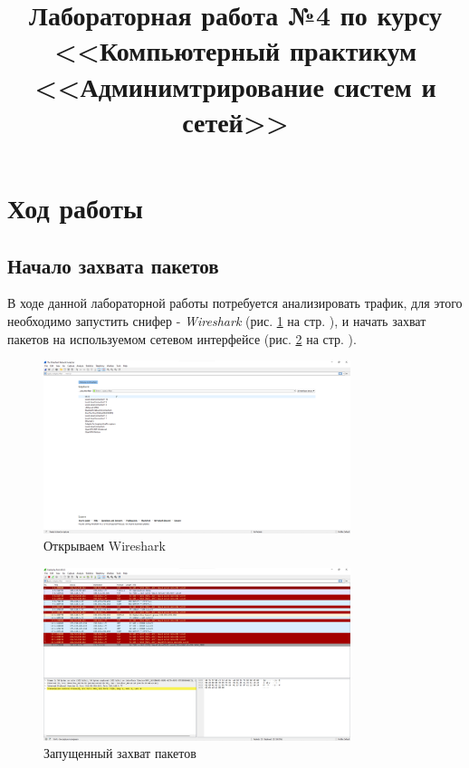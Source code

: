 \documentclass[a4paper]{article}
\title{
  Лабораторная работа №4 по курсу \\
  <<Компьютерный практикум <<Админимтрирование систем и сетей>>  
}
\begin{document}
  \templatedtitlepage
  
  \toc
  \section{Ход работы}

  \subsection{Начало захвата пакетов}

  В ходе данной лабораторной работы потребуется анализировать
  трафик, для этого необходимо запустить снифер - \textit{Wireshark} (рис. \ref{img:0001} на стр. \pageref{img:0001}),
  и начать захват пакетов на используемом сетевом интерфейсе (рис. \ref{img:0002} на стр. \pageref{img:0002}).

  \begin{figure}[H]
    \centering
    \includegraphics[width=0.8\textwidth]{04_00 (1)}
    \caption{Открываем Wireshark}
    \label{img:0001}
  \end{figure}
  
  \begin{figure}[H]
    \centering
    \includegraphics[width=0.8\textwidth]{04_00 (2)}
    \caption{Запущенный захват пакетов}
    \label{img:0002}
  \end{figure}
\end{document}
